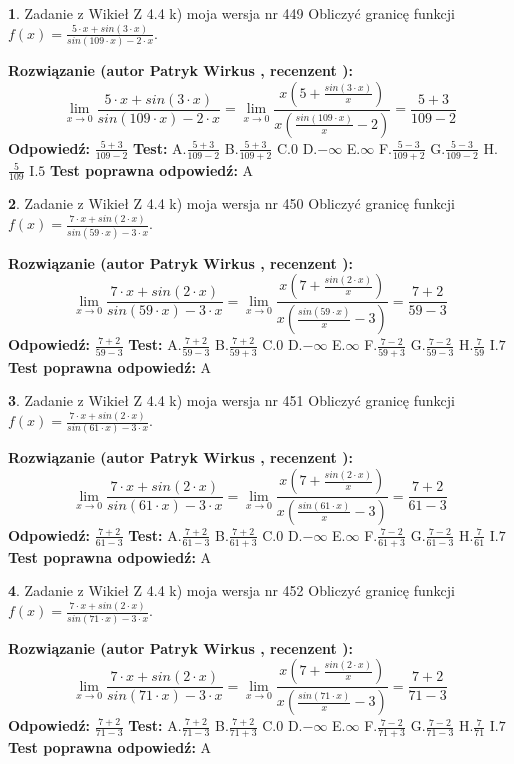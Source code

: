 \documentclass[12pt, a4paper]{article}
\theoremstyle{definition} %
\newtheorem{zad}{}
\newcommand{\zadStart}[1]{\begin{zad}#1\newline}
\newcommand{\zadStop}{\end{zad}}
\newcommand{\rozwStart}[2]{\noindent \textbf{Rozwiązanie (autor #1 , recenzent #2): }\newline}
\newcommand{\rozwStop}{\newline}
\newcommand{\odpStart}{\noindent \textbf{Odpowiedź:}\newline}
\newcommand{\odpStop}{\newline}
\newcommand{\testStart}{\noindent \textbf{Test:}\newline}
\newcommand{\testStop}{\newline}
\newcommand{\kluczStart}{\noindent \textbf{Test poprawna odpowiedź:}\newline}
\newcommand{\kluczStop}{\newline}
\begin{document}
\zadStart{Zadanie z Wikieł Z 4.4 k) moja wersja nr 449}
Obliczyć granicę funkcji $f(x)=\frac{5\cdot x +sin(3\cdot x)}{sin(109\cdot x) -2\cdot x}$.
\zadStop
\rozwStart{Patryk Wirkus}{}
$$\lim\limits_{x\to 0}\frac{5\cdot x +sin(3\cdot x)}{sin(109\cdot x) -2\cdot x}
=\lim\limits_{x\to 0}\frac{x(5+\frac{sin(3\cdot x)}{x})}{x(\frac{sin(109\cdot x)}{x}-2)}
=\frac{5+3}{109-2}$$
\rozwStop
\odpStart
$\frac{5+3}{109-2}$
\odpStop
\testStart
A.$\frac{5+3}{109-2}$
B.$\frac{5+3}{109+2}$
C.$0$
D.$-\infty$
E.$\infty$
F.$\frac{5-3}{109+2}$
G.$\frac{5-3}{109-2}$
H.$\frac{5}{109}$
I.$5$
\testStop
\kluczStart
A
\kluczStop



\zadStart{Zadanie z Wikieł Z 4.4 k) moja wersja nr 450}
Obliczyć granicę funkcji $f(x)=\frac{7\cdot x +sin(2\cdot x)}{sin(59\cdot x) -3\cdot x}$.
\zadStop
\rozwStart{Patryk Wirkus}{}
$$\lim\limits_{x\to 0}\frac{7\cdot x +sin(2\cdot x)}{sin(59\cdot x) -3\cdot x}
=\lim\limits_{x\to 0}\frac{x(7+\frac{sin(2\cdot x)}{x})}{x(\frac{sin(59\cdot x)}{x}-3)}
=\frac{7+2}{59-3}$$
\rozwStop
\odpStart
$\frac{7+2}{59-3}$
\odpStop
\testStart
A.$\frac{7+2}{59-3}$
B.$\frac{7+2}{59+3}$
C.$0$
D.$-\infty$
E.$\infty$
F.$\frac{7-2}{59+3}$
G.$\frac{7-2}{59-3}$
H.$\frac{7}{59}$
I.$7$
\testStop
\kluczStart
A
\kluczStop



\zadStart{Zadanie z Wikieł Z 4.4 k) moja wersja nr 451}
Obliczyć granicę funkcji $f(x)=\frac{7\cdot x +sin(2\cdot x)}{sin(61\cdot x) -3\cdot x}$.
\zadStop
\rozwStart{Patryk Wirkus}{}
$$\lim\limits_{x\to 0}\frac{7\cdot x +sin(2\cdot x)}{sin(61\cdot x) -3\cdot x}
=\lim\limits_{x\to 0}\frac{x(7+\frac{sin(2\cdot x)}{x})}{x(\frac{sin(61\cdot x)}{x}-3)}
=\frac{7+2}{61-3}$$
\rozwStop
\odpStart
$\frac{7+2}{61-3}$
\odpStop
\testStart
A.$\frac{7+2}{61-3}$
B.$\frac{7+2}{61+3}$
C.$0$
D.$-\infty$
E.$\infty$
F.$\frac{7-2}{61+3}$
G.$\frac{7-2}{61-3}$
H.$\frac{7}{61}$
I.$7$
\testStop
\kluczStart
A
\kluczStop



\zadStart{Zadanie z Wikieł Z 4.4 k) moja wersja nr 452}
Obliczyć granicę funkcji $f(x)=\frac{7\cdot x +sin(2\cdot x)}{sin(71\cdot x) -3\cdot x}$.
\zadStop
\rozwStart{Patryk Wirkus}{}
$$\lim\limits_{x\to 0}\frac{7\cdot x +sin(2\cdot x)}{sin(71\cdot x) -3\cdot x}
=\lim\limits_{x\to 0}\frac{x(7+\frac{sin(2\cdot x)}{x})}{x(\frac{sin(71\cdot x)}{x}-3)}
=\frac{7+2}{71-3}$$
\rozwStop
\odpStart
$\frac{7+2}{71-3}$
\odpStop
\testStart
A.$\frac{7+2}{71-3}$
B.$\frac{7+2}{71+3}$
C.$0$
D.$-\infty$
E.$\infty$
F.$\frac{7-2}{71+3}$
G.$\frac{7-2}{71-3}$
H.$\frac{7}{71}$
I.$7$
\testStop
\kluczStart
A
\kluczStop
\end{document}
